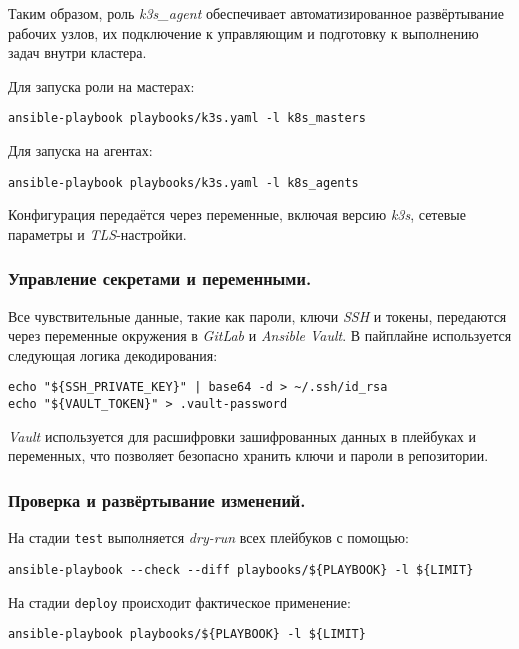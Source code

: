Таким образом, роль \textit{k3s\_agent} обеспечивает автоматизированное развёртывание рабочих узлов, их подключение к управляющим и подготовку к выполнению задач внутри кластера.

Для запуска роли на мастерах:

\begin{lstlisting}
ansible-playbook playbooks/k3s.yaml -l k8s_masters
\end{lstlisting}

Для запуска на агентах:

\begin{lstlisting}
ansible-playbook playbooks/k3s.yaml -l k8s_agents
\end{lstlisting}

Конфигурация передаётся через переменные, включая версию \textit{k3s}, сетевые параметры и \textit{TLS}-настройки.

\subsubsection{Управление секретами и переменными.} Все чувствительные данные, такие как пароли, ключи \textit{SSH} и токены, передаются через переменные окружения в \textit{GitLab} и \textit{Ansible Vault}. В пайплайне используется следующая логика декодирования:

\begin{lstlisting}
echo "${SSH_PRIVATE_KEY}" | base64 -d > ~/.ssh/id_rsa
echo "${VAULT_TOKEN}" > .vault-password
\end{lstlisting}

\textit{Vault} используется для расшифровки зашифрованных данных в плейбуках и переменных, что позволяет безопасно хранить ключи и пароли в репозитории.

\subsubsection{Проверка и развёртывание изменений.} На стадии \lstinline{test} выполняется \textit{dry-run} всех плейбуков с помощью:

\begin{lstlisting}
ansible-playbook --check --diff playbooks/${PLAYBOOK} -l ${LIMIT}
\end{lstlisting}

На стадии \lstinline{deploy} происходит фактическое применение:

\begin{lstlisting}
ansible-playbook playbooks/${PLAYBOOK} -l ${LIMIT}
\end{lstlisting}

